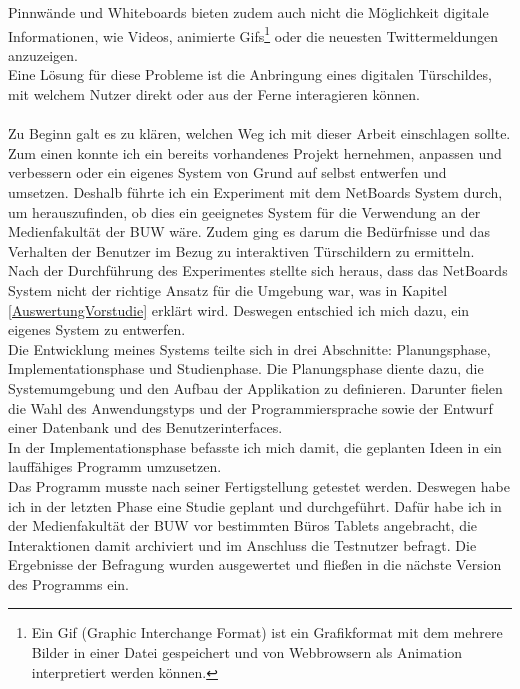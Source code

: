 Pinnwände und Whiteboards bieten zudem auch nicht die Möglichkeit digitale Informationen, wie Videos, animierte Gifs\footnote{Ein Gif (Graphic Interchange Format) ist ein Grafikformat mit dem mehrere Bilder in einer Datei gespeichert und von Webbrowsern als Animation interpretiert werden können.} oder die neuesten Twittermeldungen anzuzeigen.
\\
Eine Lösung für diese Probleme ist die Anbringung eines digitalen Türschildes, mit welchem Nutzer direkt oder aus der Ferne interagieren können.
\\
\\
Zu Beginn galt es zu klären, welchen Weg ich mit dieser Arbeit einschlagen sollte.
\\
Zum einen konnte ich ein bereits vorhandenes Projekt hernehmen, anpassen und verbessern oder ein eigenes System von Grund auf selbst entwerfen und umsetzen.
Deshalb führte ich ein Experiment mit dem NetBoards System\cite{wood:2014,netboards:website} durch, um herauszufinden, ob dies ein geeignetes System für die Verwendung an der Medienfakultät der BUW wäre. Zudem ging es darum die Bedürfnisse und das Verhalten der Benutzer im Bezug zu interaktiven Türschildern zu ermitteln.
\\
Nach der Durchführung des Experimentes stellte sich heraus, dass das NetBoards System nicht der richtige Ansatz für die Umgebung war, was in Kapitel \ref{AuswertungVorstudie} erklärt wird. Deswegen entschied ich mich dazu, ein eigenes System zu entwerfen.
\\
Die Entwicklung meines Systems teilte sich in drei Abschnitte: Planungsphase, Implementationsphase und Studienphase.
Die Planungsphase diente dazu, die Systemumgebung und den Aufbau der Applikation zu definieren.
Darunter fielen die Wahl des Anwendungstyps und der Programmiersprache sowie der Entwurf einer Datenbank und des Benutzerinterfaces.
\\
In der Implementationsphase befasste ich mich damit, die geplanten Ideen in ein lauffähiges Programm umzusetzen.
\\
Das Programm musste nach seiner Fertigstellung getestet werden. Deswegen habe ich in der letzten Phase eine Studie geplant und durchgeführt. Dafür habe ich in der Medienfakultät der BUW vor bestimmten Büros Tablets angebracht, die Interaktionen damit archiviert und im Anschluss die Testnutzer befragt. Die Ergebnisse der Befragung wurden ausgewertet und fließen in die nächste Version des Programms ein.